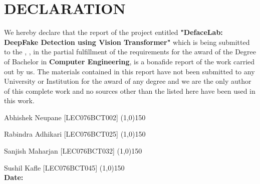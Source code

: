 \section*{DECLARATION}

We hereby declare that the report of the project entitled \textbf{"DefaceLab:  DeepFake Detection using Vision Transformer"} which is
being submitted to the \textbf{\thedepartment}, \textbf{\thecampus}, in the partial fulfillment of the requirements for the award
of the Degree of Bachelor in \textbf{Computer Engineering}, is a bonafide report of the work carried out by us. The materials
contained in this report have not been submitted to any University or Institution for
the award of any degree and we are the only author of this complete work and no
sources other than the listed here have been used in this work.

\vspace{2cm}
\noindent Abhishek Neupane [LEC076BCT002] \space{}\space{}\space{}\space{}\space{}\space{}  \line(1,0){150}\\
\vspace{0.1cm}

\noindent Rabindra Adhikari [LEC076BCT025] \space{}\space{}\space{}\space{}\space{}\space{}\space{} \line(1,0){150} \\
\vspace{0.1cm}

\noindent Sanjish Maharjan [LEC076BCT032]\space{}\space{}\space{}\space{}\space{}\space{}\space{}\space{}\space{} \line(1,0){150} \\
\vspace{0.1cm}

\noindent Sushil Kafle [LEC076BCT045]\space{}\space{}\space{}\space{}\space{}\space{}\space{}\space{} \space{}\space{}\space{}\space{}\space{}\space{}\space{}\space{}\space{}\line(1,0){150}\\


\vspace{0.7cm}
\noindent \textbf{Date: }\thedate \\

